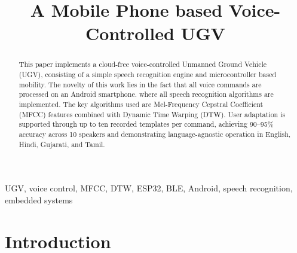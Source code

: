 \documentclass[conference]{IEEEtran}
\begin{document}
\title{A Mobile Phone based Voice-Controlled UGV
}

\author{
}

\maketitle

\begin{abstract}
This paper implements a cloud-free voice-controlled Unmanned Ground
Vehicle (UGV), consisting of a simple speech recognition engine and microcontroller based mobility.
The novelty of this work lies in the fact that
all 
voice commands are processed 
on an Android
smartphone. 
where  all speech recognition algorithms are implemented.
The key algorithms used are Mel-Frequency Cepstral Coefficient (MFCC) features
combined with Dynamic Time Warping (DTW).
User adaptation is supported through up to ten recorded templates
per command, achieving 90--95\% accuracy across 10 speakers and demonstrating
language-agnostic operation in English, Hindi, Gujarati, and Tamil.

\end{abstract}

\begin{IEEEkeywords}
UGV, voice control, MFCC, DTW, ESP32, BLE, Android, speech recognition,
embedded systems
\end{IEEEkeywords}

\section{Introduction} \label{sec:intro}
\end{document}
